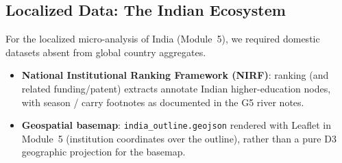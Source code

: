 \subsection{Localized Data: The Indian Ecosystem}
For the localized micro-analysis of India (Module~5), we required domestic datasets absent from global country aggregates.
\begin{itemize}
    \item \textbf{National Institutional Ranking Framework (NIRF)}: ranking (and related funding/patent) extracts annotate Indian higher-education nodes, with season / carry footnotes as documented in the G5 river notes.
    \item \textbf{Geospatial basemap}: \texttt{india\_outline.geojson} rendered with Leaflet in Module~5 (institution coordinates over the outline), rather than a pure D3 geographic projection for the basemap.
\end{itemize}
